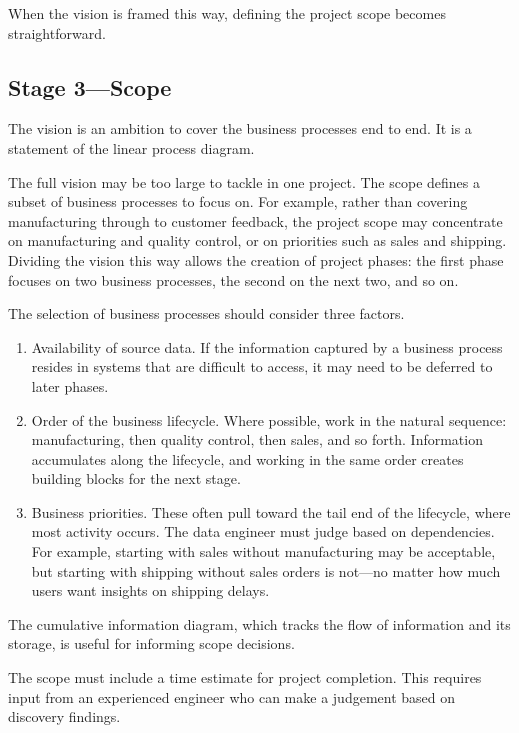 \documentclass[10pt,openany,10pt]{book}
\begin{document}
When the vision is framed this way, defining the project scope becomes
straightforward.

\subsection{Stage 3---Scope}\label{stage-3scope}

The vision is an ambition to cover the business processes end to end. It
is a statement of the linear process diagram.

The full vision may be too large to tackle in one project. The scope
defines a subset of business processes to focus on. For example, rather
than covering manufacturing through to customer feedback, the project
scope may concentrate on manufacturing and quality control, or on
priorities such as sales and shipping. Dividing the vision this way
allows the creation of project phases: the first phase focuses on two
business processes, the second on the next two, and so on.

The selection of business processes should consider three factors.

\begin{enumerate}
\def\labelenumi{\arabic{enumi}.}
\item
  Availability of source data. If the information captured by a business
  process resides in systems that are difficult to access, it may need
  to be deferred to later phases.
\item
  Order of the business lifecycle. Where possible, work in the natural
  sequence: manufacturing, then quality control, then sales, and so
  forth. Information accumulates along the lifecycle, and working in the
  same order creates building blocks for the next stage.
\item
  Business priorities. These often pull toward the tail end of the
  lifecycle, where most activity occurs. The data engineer must judge
  based on dependencies. For example, starting with sales without
  manufacturing may be acceptable, but starting with shipping without
  sales orders is not---no matter how much users want insights on
  shipping delays.
\end{enumerate}

The cumulative information diagram, which tracks the flow of information
and its storage, is useful for informing scope decisions.

The scope must include a time estimate for project completion. This
requires input from an experienced engineer who can make a judgement
based on discovery findings.
\end{document}
